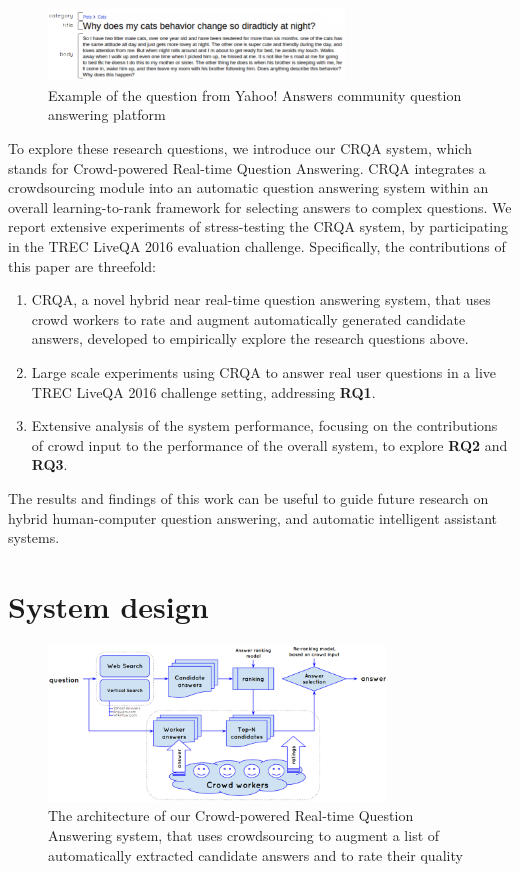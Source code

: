 \documentclass[letterpaper]{article}
\begin{document}
\begin{figure}[h!t]
	\centering
	\includegraphics[width=0.7\textwidth]{img/ya_question}
	\caption{Example of the question from Yahoo! Answers community question answering platform}
	\label{fig:ya_question}
\end{figure}

To explore these research questions, we introduce our CRQA system, which stands for Crowd-powered Real-time Question Answering.
CRQA integrates a crowdsourcing module into an automatic question answering system within an overall learning-to-rank framework for selecting answers to complex questions.
We report extensive experiments of stress-testing the CRQA system, by participating in the TREC LiveQA 2016 evaluation challenge.
Specifically, the contributions of this paper are threefold:
\begin{enumerate}
	\item CRQA, a novel hybrid near real-time question answering system, that uses crowd workers to rate and augment automatically generated candidate answers, developed to empirically explore the research questions above.
	\item Large scale experiments using CRQA to answer real user questions in a live TREC LiveQA 2016 challenge setting, addressing \textbf{RQ1}.
	\item Extensive analysis of the system performance, focusing on the contributions of crowd input to the performance of the overall system, to explore \textbf{RQ2} and \textbf{RQ3}.
\end{enumerate}

The results and findings of this work can be useful to guide future research on hybrid human-computer question answering, and automatic intelligent assistant systems.

\section{System design}
\label{sec:system}

\begin{figure}[h!t]
	\centering
	\includegraphics[width=0.8\textwidth]{img/system}
	\caption{The architecture of our Crowd-powered Real-time Question Answering system, that uses crowdsourcing to augment a list of automatically extracted candidate answers and to rate their quality}
	\label{fig:system}
\end{figure}
\end{document}
